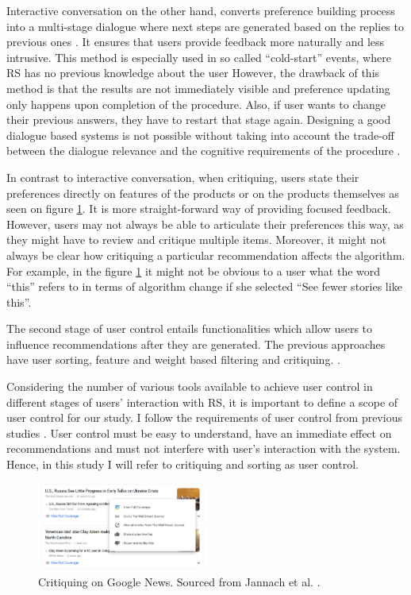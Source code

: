 \documentclass[a4paper,12pt]{article}
\newcommand{\citeyearonly}[1]{\citeyearpar{#1}}
\begin{document}
Interactive conversation on the other hand, converts preference building process into a multi-stage dialogue where next steps are generated based on the replies to previous ones \citep{he2016interactive}. It ensures that users provide feedback more naturally and less intrusive. This method is especially used in so called ``cold-start'' events, where RS has no previous knowledge about the user \citep{guAddressingColdStartProblem2019} However, the drawback of this method is that the results are not immediately visible and preference updating only happens upon completion of the procedure. Also, if user wants to change their previous answers, they have to restart that stage again. Designing a good dialogue based systems is not possible without taking into account the trade-off between the dialogue relevance and the cognitive requirements of the procedure \citep{Gao_2021}. 

In contrast to interactive conversation, when critiquing, users state their preferences directly on features of the products or on the products themselves as seen on figure \ref{fig:critiquing}. It is more straight-forward way of providing focused feedback. However, users may not always be able to articulate their preferences this way, as they might have to review and critique multiple items. Moreover, it might not always be clear how critiquing a particular recommendation affects the algorithm. For example, in the figure \ref{fig:critiquing} it might not be obvious to a user what the word ``this'' refers to in terms of algorithm change if she selected ``See fewer stories like this''.

The second stage of user control entails functionalities which allow users to influence recommendations after they are generated. The previous approaches have user sorting, feature and weight based filtering and critiquing. \citep{swearingen2001beyond, schafer2002meta, bostandjiev2012tasteweights, schaffer2015hypothetical, jannach2017user}. 

Considering the number of various tools available to achieve user control in different stages of users' interaction with RS, it is important to define a scope of user control for our study. I follow the requirements of user control from previous  studies \citep{jannach2017user}. User control must be easy to understand, have an immediate effect on recommendations and must not interfere with user's interaction with the system. Hence, in this study I will refer to critiquing and sorting as user control. 

\begin{figure}[H]
    \centering
    \includegraphics[width=0.5\textwidth]{staticFiles/critiquingRS.PNG}
    \caption[Critiquing in RS]{Critiquing on Google News. Sourced from Jannach et al. \citeyearonly{jannach2017user}.}
    \label{fig:critiquing}
\end{figure}
\end{document}
